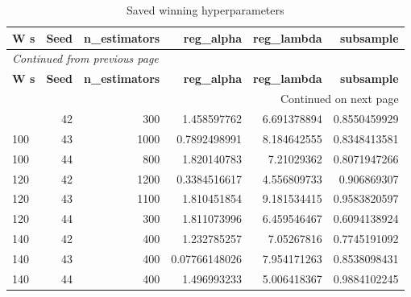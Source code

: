 \documentclass[10pt,a4paper]{article}
\begin{document}
\begin{longtable}{@{}lrrrrr@{}}
\caption{Saved winning hyperparameters}\\
\toprule
\textbf{W s} & \textbf{Seed} & \textbf{n\_\allowbreak{}estimators} & \textbf{reg\_\allowbreak{}alpha} & \textbf{reg\_\allowbreak{}lambda} & \textbf{subsample} \\
\midrule\endfirsthead
\multicolumn{6}{l}{\small\itshape Continued from previous page}\\
\toprule
\textbf{W s} & \textbf{Seed} & \textbf{n\_\allowbreak{}estimators} & \textbf{reg\_\allowbreak{}alpha} & \textbf{reg\_\allowbreak{}lambda} & \textbf{subsample} \\
\midrule\endhead
\midrule\multicolumn{6}{r}{\small Continued on next page}\\\endfoot
\bottomrule\endlastfoot
100 & 42 & 300 & 1.458597762 & 6.691378894 & 0.8550459929 \\
100 & 43 & 1000 & 0.7892498991 & 8.184642555 & 0.8348413581 \\
100 & 44 & 800 & 1.820140783 & 7.21029362 & 0.8071947266 \\
120 & 42 & 1200 & 0.3384516617 & 4.556809733 & 0.906869307 \\
120 & 43 & 1100 & 1.810451854 & 9.181534415 & 0.9583820597 \\
120 & 44 & 300 & 1.811073996 & 6.459546467 & 0.6094138924 \\
140 & 42 & 400 & 1.232785257 & 7.05267816 & 0.7745191092 \\
140 & 43 & 400 & 0.07766148026 & 7.954171263 & 0.8538098431 \\
140 & 44 & 400 & 1.496993233 & 5.006418367 & 0.9884102245 \\
\end{longtable}\endgroup
\begingroup\small\setlength{\tabcolsep}{4pt}\renewcommand{\arraystretch}{1.12}
\end{document}
